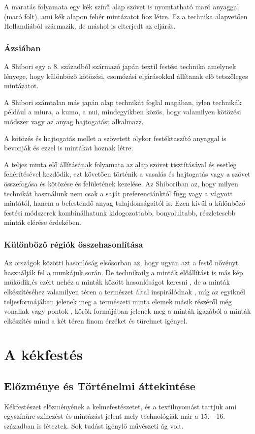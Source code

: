 \documentclass[fontsize=12pt, appendixprefix=true]{scrreprt}
\begin{document}
A maratás folyamata egy kék színű alap szövet is nyomtatható maró anyaggal (maró folt), ami kék alapon fehér mintázatot hoz  létre. Ez a technika alapvetően Hollandiából származik, de máshol is elterjedt az eljárás.

\subsection{Ázsiában}
A Shibori egy a 8. századból származó japán textil festési technika amelynek lényege, hogy különböző kötözési, csomózási eljárásokkal állítanak elő tetszőleges mintázatot.

A Shibori számtalan más japán alap technikát foglal magában, iylen technikák például a miura, a kumo, a nui, mindegyikben közös, hogy valamilyen kötözési módszer vagy az anyag hajtogatást alkalmazz. 

A kötözés és hajtogatás mellet a szövetett olykor festéktaszító anyaggal is bevonják és ezzel is mintákat hoznak létre.

A teljes minta elő állításának folyamata az alap szövet tisztításával és esetleg fehérítésével kezdődik, ezt követően történik a vasalás és hajtogatás vagy a szövet összefogása és kötözése és felületének kezelése.
Az Shiboriban az, hogy milyen technikát használunk nem csak a saját preferenciánktól függ vagy a vágyott mintától, hanem a befestendő anyag tulajdonságaitól is. Ezen kívül  a különböző festési módszerek kombinálhatunk kidogozottabb, bonyolultabb, részletesebb minták elérése érdekében. 

\subsection{Különböző régiók összehasonlítása}
   Az országok közötti hasonlóság elsősorban az, hogy ugyan azt a festő nővényt használják fel a munkájuk során.
   De technikailg a minták előállítást is más kép működik,és ezért nehéz a minták kőzött hasonlóságot keresni , de a  minták  elkészítéséhez valamilyen téren a természet által inspirálódnak , míg az egyiknél teljesformájában jelenek meg a természeti minta elemek másik részéről még vonallak vagy pontok , körök formájában jelenek meg a minták  
    igazából a minták elkészítés mind a két téren finom érzéket és türelmet igényel.

\chapter{A kékfestés}
\section{Előzménye és Történelmi áttekintése}
Kékfestészet előzményének a kelmefestészetet, és a textilnyomást tartjuk ami egyszínűre színezést és mintázást jelent mely technológiák már a 15. - 16. században is léteztek. Sok tudást igénylő művészeti ág volt.
\end{document}
